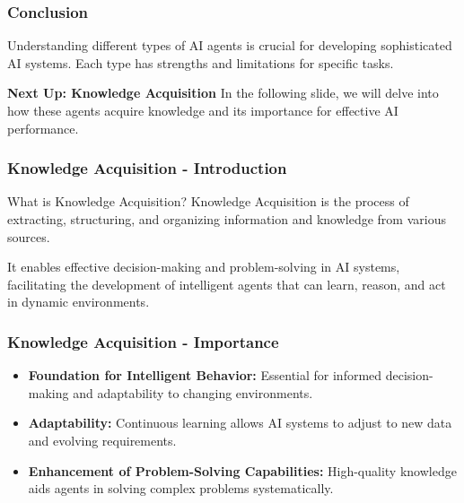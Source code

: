 \documentclass[aspectratio=169]{beamer}
\begin{document}
\begin{frame}[fragile]
    \frametitle{Conclusion}
    Understanding different types of AI agents is crucial for developing sophisticated AI systems. Each type has strengths and limitations for specific tasks. 

    \textbf{Next Up: Knowledge Acquisition}
    In the following slide, we will delve into how these agents acquire knowledge and its importance for effective AI performance.
\end{frame}

\begin{frame}[fragile]
    \frametitle{Knowledge Acquisition - Introduction}
    \begin{block}{What is Knowledge Acquisition?}
        Knowledge Acquisition is the process of extracting, structuring, and organizing information and knowledge from various sources.
    \end{block}
    It enables effective decision-making and problem-solving in AI systems, facilitating the development of intelligent agents that can learn, reason, and act in dynamic environments.
\end{frame}

\begin{frame}[fragile]
    \frametitle{Knowledge Acquisition - Importance}
    \begin{itemize}
        \item \textbf{Foundation for Intelligent Behavior:} Essential for informed decision-making and adaptability to changing environments.
        \item \textbf{Adaptability:} Continuous learning allows AI systems to adjust to new data and evolving requirements.
        \item \textbf{Enhancement of Problem-Solving Capabilities:} High-quality knowledge aids agents in solving complex problems systematically.
    \end{itemize}
\end{frame}
\end{document}
